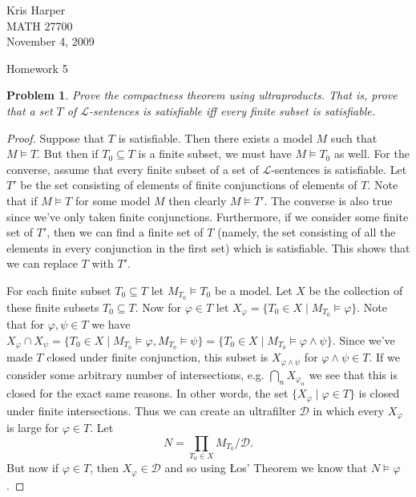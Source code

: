 \documentclass{article}
\newtheorem{problem}{Problem}
\begin{document}
\begin{flushright}
Kris Harper\\

MATH 27700\\

November 4, 2009
\end{flushright}

\begin{center}
Homework 5
\end{center}

\begin{problem}
Prove the compactness theorem using ultraproducts. That is, prove that a set $T$ of $\mathcal{L}$-sentences is satisfiable iff every finite subset is satisfiable.
\end{problem}
\begin{proof}
Suppose that $T$ is satisfiable. Then there exists a model $M$ such that $M \models T$. But then if $T_0 \subseteq T$ is a finite subset, we must have $M \models T_0$ as well. For the converse, assume that every finite subset of a set of $\mathcal{L}$-sentences is satisfiable. Let $T'$ be the set consisting of elements of finite conjunctions of elements of $T$. Note that if $M \models T$ for some model $M$ then clearly $M \models T'$. The converse is also true since we've only taken finite conjunctions. Furthermore, if we consider some finite set of $T'$, then we can find a finite set of $T$ (namely, the set consisting of all the elements in every conjunction in the first set) which is satisfiable. This shows that we can replace $T$ with $T'$.

For each finite subset $T_0 \subseteq T$ let $M_{T_0} \models T_0$ be a model. Let $X$ be the collection of these finite subsets $T_0 \subseteq T$. Now for $\varphi \in T$ let $X_{\varphi} = \{T_0 \in X \mid M_{T_0} \models \varphi\}$. Note that for $\varphi, \psi \in T$ we have $X_{\varphi} \cap X_{\psi} = \{T_0 \in X \mid M_{T_0} \models \varphi, M_{T_0} \models \psi\} = \{T_0 \in X \mid M_{T_0} \models \varphi \wedge \psi\}$. Since we've made $T$ closed under finite conjunction, this subset is $X_{\varphi \wedge \psi}$ for $\varphi \wedge \psi \in T$. If we consider some arbitrary number of intersections, e.g. $\bigcap_{n} X_{\varphi_n}$ we see that this is closed for the exact same reasons. In other words, the set $\{X_{\varphi} \mid \varphi \in T\}$ is closed under finite intersections. Thus we can create an ultrafilter $\mathcal{D}$ in which every $X_{\varphi}$ is large for $\varphi \in T$. Let
\[
N = \prod_{T_0 \in X} M_{T_0}/\mathcal{D}.
\]
But now if $\varphi \in T$, then $X_{\varphi} \in \mathcal{D}$ and so using \L os' Theorem we know that $N \models \varphi$.
\end{proof}
\end{document}

